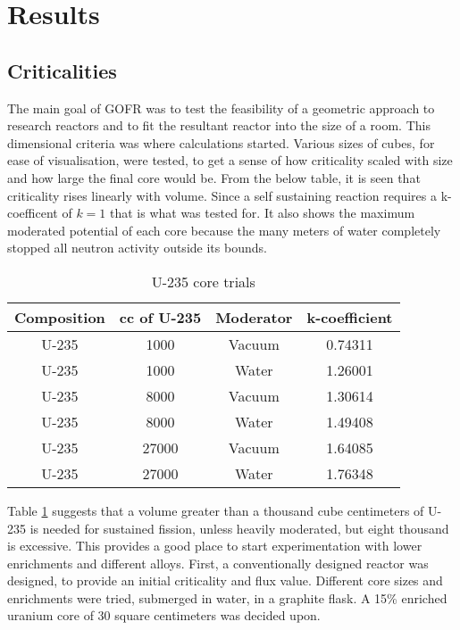\label{sec:results}
\section{Results}

\subsection{Criticalities}

The main goal of GOFR was to test the feasibility of a geometric approach to research reactors and to fit the resultant reactor into the size of a room. This dimensional criteria was where calculations started. Various sizes of cubes, for ease of visualisation, were tested, to get a sense of how criticality scaled with size and how large the final core would be. From the below table, it is seen that criticality rises linearly with volume. Since a self sustaining reaction requires a k-coefficent of $k=1$ that is what was tested for. It also shows the maximum moderated potential of each core because the many meters of water completely stopped all neutron activity outside its bounds.

\begin{table}[!htbp]
\centering
\caption{U-235 core trials}
\label{tab:pureU}
\begin{tabular}{|c|c|c|c|}
\hline
Composition & cc of U-235 		& Moderator	& k-coefficient  \\
\hline
U-235  		&  1000             & Vacuum	& 0.74311     \\
\hline
U-235  		&  1000             & Water     & 1.26001     \\
\hline
U-235  		&  8000             & Vacuum    & 1.30614     \\
\hline
U-235  		&  8000             & Water     & 1.49408     \\
\hline
U-235  		& 27000             & Vacuum    & 1.64085     \\
\hline
U-235  		& 27000             & Water     & 1.76348     \\
\hline
\end{tabular}
\end{table}

Table \ref{tab:pureU} suggests that a volume greater than a thousand cube centimeters of U-235 is needed for sustained fission, unless heavily moderated, but eight thousand is excessive. This provides a good place to start experimentation with lower enrichments and different alloys. First, a conventionally designed reactor was designed, to provide an initial criticality and flux value. Different core sizes and enrichments were tried, submerged in water, in a graphite flask. A 15\% enriched uranium core of 30 square centimeters was decided upon.

